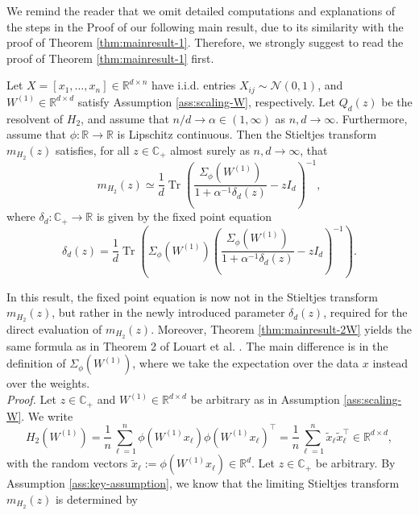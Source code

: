 \documentclass{article}
\begin{document}
\bigskip
\par
We remind the reader that we omit detailed computations and explanations of the steps in the Proof of our following main result, due to its similarity with the proof of Theorem \ref{thm:mainresult-1}. Therefore, we strongly suggest to read the proof of Theorem \ref{thm:mainresult-1} first.
\bigskip
\begin{theorem}
Let $X=[x_1,\dots,x_n]\in\mathbb{R}^{d\times n}$ have i.i.d. entries $X_{ij}\sim\mathcal{N}(0,1)$, and $W^{(1)}\in\mathbb{R}^{d\times d}$ satisfy Assumption \ref{ass:scaling-W}, respectively. Let $Q_d(z)$ be the resolvent of $H_2$, and assume that $n/d\to\alpha\in(1,\infty)$ as $n,d\to\infty$. Furthermore, assume that $\phi:\mathbb{R}\to\mathbb{R}$ is Lipschitz continuous. Then the Stieltjes transform $m_{H_2}(z)$ satisfies, for all $z\in\mathbb{C}_+$ almost surely as $n,d\to\infty$, that
\begin{equation*}
m_{H_2}(z)\simeq\frac{1}{d}\operatorname{Tr}\left(\frac{\Sigma_\phi(W^{(1)})}{1+\alpha^{-1}\delta_d(z)}-zI_d\right)^{-1},
\end{equation*}
where $\delta_d:\mathbb{C}_+\to\mathbb{R}$ is given by the fixed point equation
\begin{equation}
\delta_d(z)=\frac{1}{d}\operatorname{Tr}\left(\Sigma_\phi(W^{(1)})\left(\frac{\Sigma_\phi(W^{(1)})}{1+\alpha^{-1}\delta_d(z)}-zI_d\right)^{-1}\right).
\end{equation} \label{thm:mainresult-2W}
\end{theorem}
\bigskip
In this result, the fixed point equation is now not in the Stieltjes transform $m_{H_2}(z)$, but rather in the newly introduced parameter $\delta_d(z)$, required for the direct evaluation of $m_{H_2}(z)$. Moreover, Theorem \ref{thm:mainresult-2W} yields the same formula as in Theorem 2 of Louart et al. \cite{louart}. The main difference is in the definition of $\Sigma_\phi(W^{(1)})$, where we take the expectation over the data $x$ instead over the weights.
\bigskip
\\
\emph{Proof.} Let $z\in\mathbb{C}_+$ and $W^{(1)}\in\mathbb{R}^{d\times d}$ be arbitrary as in Assumption \ref{ass:scaling-W}. We write
\begin{equation}
H_2(W^{(1)})=\frac{1}{n}\sum_{\ell=1}^n\phi(W^{(1)}x_\ell)\phi(W^{(1)}x_\ell)^\top=\frac{1}{n}\sum_{\ell=1}^n\tilde{x}_\ell\tilde{x}_\ell^\top\in\mathbb{R}^{d\times d},
\end{equation}
with the random vectors $\tilde{x}_\ell:=\phi(W^{(1)}x_\ell)\in\mathbb{R}^{d}$. Let $z\in\mathbb{C}_+$ be arbitrary. By Assumption \ref{ass:key-assumption}, we know that the limiting Stieltjes transform $m_{H_2}(z)$ is determined by
\end{document}
